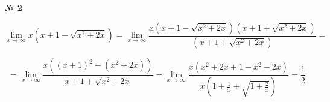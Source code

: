 \documentclass{article}
\begin{document}
\textbf{№ 2} 

\begingroup
\Large

$$ \lim\limits_{x \to \infty} x\left( x+1-\sqrt{x^2+2x} \right)
= \lim\limits_{x \to \infty} \frac{x\left( x+1-\sqrt{x^2+2x} \right) \left( x+1+\sqrt{x^2+2x} \right)}{\left( x+1+\sqrt{x^2+2x} \right)}
= $$

$$ = \lim\limits_{x \to \infty} \frac{x\left( (x+1)^2-(x^2+2x) \right)}{x+1+\sqrt{x^2+2x}} 
= \lim\limits_{x \to \infty} \frac{x\left( x^2+2x+1-x^2-2x \right)}{x\left(1+\frac{1}{x}+\sqrt{1+\frac{2}{x}}\right)} 
= \frac{1}{2} $$

\endgroup
\end{document}
